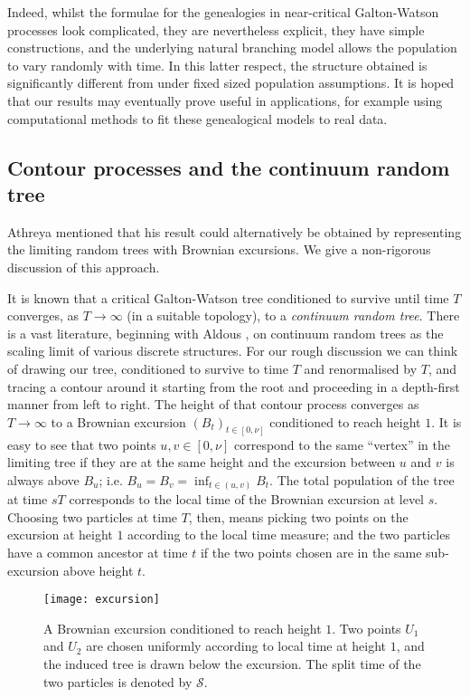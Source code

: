 \documentclass{article}
\theoremstyle{plain}
\theoremstyle{definition}
\renewcommand{\S}{\mathcal{S}}
\begin{document}
Indeed, whilst the formulae for the genealogies in near-critical Galton-Watson processes look complicated, they are nevertheless explicit, they have simple constructions, and the underlying natural branching model allows the population to vary randomly with time. In this latter respect, the structure obtained is significantly different from under fixed sized population assumptions. It is hoped that our results may eventually prove useful in applications, for example using computational methods to fit these genealogical models to real data.

\subsection{Contour processes and the continuum random tree}\label{crt_sec}

Athreya \cite{athreya:coalescence} mentioned that his result could alternatively be obtained by representing the limiting random trees with Brownian excursions. We give a non-rigorous discussion of this approach.

It is known that a critical Galton-Watson tree conditioned to survive until time $T$ converges, as $T\to\infty$ (in a suitable topology), to a \emph{continuum random tree}. There is a vast literature, beginning with Aldous \cite{aldous:CRTI}, on continuum random trees as the scaling limit of various discrete structures. For our rough discussion we can think of drawing our tree, conditioned to survive to time $T$ and renormalised by $T$, and tracing a contour around it starting from the root and proceeding in a depth-first manner from left to right. The height of that contour process converges as $T\to\infty$ to a Brownian excursion $(B_t)_{t\in[0,\nu]}$ conditioned to reach height $1$. It is easy to see that two points $u,v\in[0,\nu]$ correspond to the same ``vertex'' in the limiting tree if they are at the same height and the excursion between $u$ and $v$ is always above $B_u$; i.e. $B_u=B_v=\inf_{t\in(u,v)} B_t$. The total population of the tree at time $sT$ corresponds to the local time of the Brownian excursion at level $s$. Choosing two particles at time $T$, then, means picking two points on the excursion at height $1$ according to the local time measure; and the two particles have a common ancestor at time $t$ if the two points chosen are in the same sub-excursion above height $t$.

   \begin{figure}[h!]
   \centering
    \texttt{[image: excursion]}
    \vspace{-8mm}
   \caption{\small{A Brownian excursion conditioned to reach height $1$. Two points $U_1$ and $U_2$ are chosen uniformly according to local time at height $1$, and the induced tree is drawn below the excursion. The split time of the two particles is denoted by $\S$.}}
   \end{figure}
\end{document}
